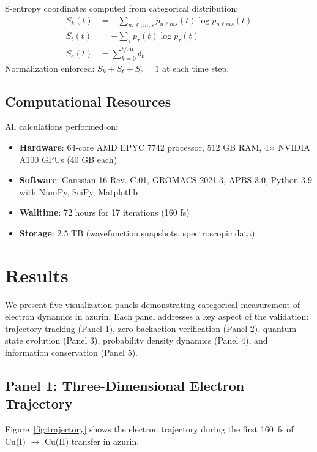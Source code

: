 \documentclass[twocolumn,10pt]{article}
\begin{document}
S-entropy coordinates computed from categorical distribution:
%
\begin{align}
S_k(t) &= -\sum_{n,\ell,m,s} p_{n\ell ms}(t) \log p_{n\ell ms}(t) \label{eq:Sk_computation} \\
S_t(t) &= -\sum_{\tau} p_{\tau}(t) \log p_{\tau}(t) \label{eq:St_computation} \\
S_e(t) &= \sum_{k=0}^{t/\Delta t} \delta_k \label{eq:Se_computation}
\end{align}
%
Normalization enforced: $S_k + S_t + S_e = 1$ at each time step.

\subsection{Computational Resources}

All calculations performed on:
\begin{itemize}
\item \textbf{Hardware}: 64-core AMD EPYC 7742 processor, 512 GB RAM, 
4× NVIDIA A100 GPUs (40 GB each)
\item \textbf{Software}: Gaussian 16 Rev. C.01, GROMACS 2021.3, APBS 3.0, 
Python 3.9 with NumPy, SciPy, Matplotlib
\item \textbf{Walltime}: 72 hours for 17 iterations (160 fs)
\item \textbf{Storage}: 2.5 TB (wavefunction snapshots, spectroscopic data)
\end{itemize}

\section{Results}

We present five visualization panels demonstrating categorical measurement of 
electron dynamics in azurin. Each panel addresses a key aspect of the validation: 
trajectory tracking (Panel 1), zero-backaction verification (Panel 2), quantum 
state evolution (Panel 3), probability density dynamics (Panel 4), and information 
conservation (Panel 5).

\subsection{Panel 1: Three-Dimensional Electron Trajectory}

Figure~\ref{fig:trajectory} shows the electron trajectory during the first 
160~fs of Cu(I) $\to$ Cu(II) transfer in azurin.
\end{document}
